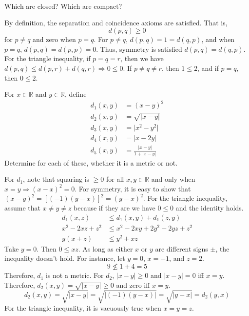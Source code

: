 \begin{exercise}
  Which are closed? Which are compact?
  \par\smallskip
  By definition, the separation and coincidence axioms are satisfied.
  That is,
  \[
  d(p, q)\geq 0
  \]
  for \(p\neq q\) and zero when \(p = q\).
  For \(p\neq q\), \(d(p,q) = 1 = d(q,p)\), and when \(p = q\),
  \(d(p,q) = d(p,p) = 0\).
  Thus, symmetry is satisfied \(d(p,q) = d(q,p)\).
  For the triangle inequality, if \(p = q = r\), then we have
  \(d(p,q)\leq d(p,r) + d(q,r)\Rightarrow 0\leq 0\).
  If \(p\neq q\neq r\), then \(1\leq 2\), and if \(p = q\), then \(0\leq 2\).
\item
  For \(x\in\mathbb{R}\) and \(y\in\mathbb{R}\), define
  \begin{align*}
    d_1(x, y) & = (x - y)^2\\
    d_2(x, y) & = \sqrt{\lvert x - y\rvert}\\
    d_3(x, y) & = \lvert x^2 - y^2\rvert\\
    d_4(x, y) & = \lvert x - 2y\rvert\\
    d_5(x, y) & = \frac{\lvert x - y\rvert}{1 + \lvert x - y\rvert}
  \end{align*}
  Determine for each of these, whether it is a metric or not.
  \par\smallskip
  For \(d_1\), note that squaring is \(\geq 0\) for all \(x,y\in\mathbb{R}\)
  and only when \(x = y\Rightarrow (x - x)^2 = 0\).
  For symmetry, it is easy to show that
  \((x - y)^2 = [(-1)(y - x)]^2 = (y - x)^2\).
  For the triangle inequality, assume that \(x\neq y\neq z\) because if they
  are we have \(0\leq 0\) and the identity holds.
  \begin{align*}
    d_1(x, z) & \leq d_1(x, y) + d_1(z, y)\\
    x^2 - 2xz + z^2 & \leq x^2 - 2xy + 2y^2 -2yz + z^2\\
    y(x + z) & \leq y^2 + xz
  \end{align*}
  Take \(y = 0\).
  Then \(0\leq xz\).
  As long as either \(x\) or \(y\) are different signs \(\pm\), the inequality
  doesn't hold.
  For instance, let \(y = 0\), \(x = -1\), and \(z = 2\).
  \[
  9\not\leq 1 + 4 = 5
  \]
  Therefore, \(d_1\) is not a metric.
  For \(d_2\), \(\lvert x - y\rvert\geq 0\) and \(\lvert x - y\rvert = 0\) iff
  \(x = y\).
  Therefore, \(d_2(x,y) = \sqrt{\lvert x - y\rvert}\geq 0\) and zero iff
  \(x = y\).
  \[
  d_2(x, y) = \sqrt{\lvert x - y\rvert} = \sqrt{\lvert (-1)(y - x)\rvert} =
  \sqrt{\lvert y - x\rvert} = d_2(y, x)
  \]
  For the triangle inequality, it is vacuously true when \(x = y = z\).

\end{exercise}
